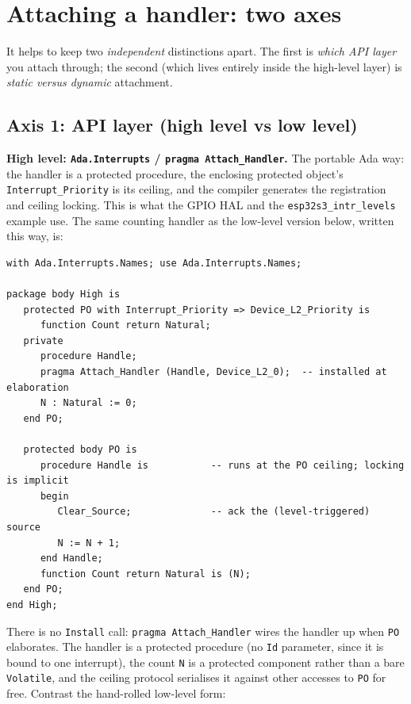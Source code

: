 \section{Attaching a handler: two axes}

It helps to keep two \emph{independent} distinctions apart. The first is
\emph{which API layer} you attach through; the second (which lives entirely
inside the high-level layer) is \emph{static versus dynamic} attachment.

\subsection{Axis 1: API layer (high level vs low level)}

\textbf{High level: \texttt{Ada.Interrupts} / \texttt{pragma Attach\_Handler}.}
The portable Ada way: the handler is a protected procedure, the enclosing
protected object's \texttt{Interrupt\_Priority} is its ceiling, and the compiler
generates the registration and ceiling locking. This is what the GPIO HAL and the
\texttt{esp32s3\_intr\_levels} example use. The same counting handler as the
low-level version below, written this way, is:

\begin{lstlisting}
with Ada.Interrupts.Names; use Ada.Interrupts.Names;

package body High is
   protected PO with Interrupt_Priority => Device_L2_Priority is
      function Count return Natural;
   private
      procedure Handle;
      pragma Attach_Handler (Handle, Device_L2_0);  -- installed at elaboration
      N : Natural := 0;
   end PO;

   protected body PO is
      procedure Handle is           -- runs at the PO ceiling; locking is implicit
      begin
         Clear_Source;              -- ack the (level-triggered) source
         N := N + 1;
      end Handle;
      function Count return Natural is (N);
   end PO;
end High;
\end{lstlisting}

There is no \texttt{Install} call: \texttt{pragma Attach\_Handler} wires the
handler up when \texttt{PO} elaborates. The handler is a protected procedure (no
\texttt{Id} parameter, since it is bound to one interrupt), the count \texttt{N} is a
protected component rather than a bare \texttt{Volatile}, and the ceiling protocol
serialises it against other accesses to \texttt{PO} for free. Contrast the
hand-rolled low-level form:

